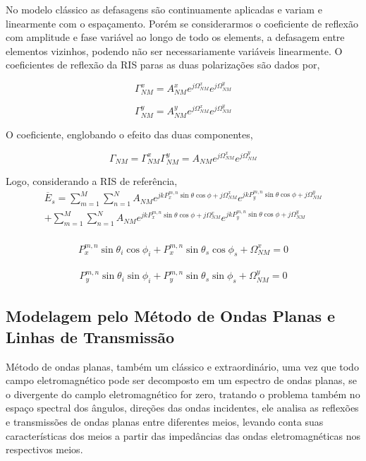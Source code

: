 \documentclass[
	12pt,				%
	openright,			%
	oneside,			%
	a4paper,			%
	english,			%
	brazil				%
	]{abntex2}
\begin{document}
No modelo clássico as defasagens são continuamente aplicadas e variam e linearmente com o espaçamento.
Porém se considerarmos o coeficiente de reflexão com amplitude e fase variável ao longo de todo os elements, a defasagem entre elementos vizinhos, podendo não ser necessariamente variáveis linearmente. O coeficientes de reflexão da RIS paras as duas polarizações são dados por,

\begin{equation}
\Gamma^{x}_{NM}=A^{x}_{NM} e^{j \Omega^x_{NM}}e^{j \Omega^y_{NM}}
\end{equation}

\begin{equation}
\Gamma^{y}_{NM}=A^{y}_{NM} e^{j \Omega^x_{NM}}e^{j \Omega^y_{NM}}
\end{equation}

O coeficiente, englobando o efeito das duas componentes,

\begin{equation}
\Gamma_{NM}=\Gamma^{x}_{NM}\Gamma^{y}_{NM}=A_{NM} e^{j \Omega^x_{NM}}e^{j \Omega^y_{NM}}
\end{equation}

Logo, considerando a RIS de referência, 
\begin{align}
\overline{E}_s=\sum_{m=1}^{M} \sum_{n=1}^{N} A_{NM}e^{jk P_x^{m,n}\sin \theta \cos \phi+j\Omega_{NM}^x}
                                e^{jk P_y^{m,n}\sin \theta \cos \phi+j\Omega_{NM}^y}\\
                                
   +\sum_{m=1}^{M} \sum_{n=1}^{N} A_{NM}e^{jk P_x^{m,n}\sin \theta \cos \phi+j\Omega_{NM}^x}
                                e^{jk P_y^{m,n}\sin \theta \cos \phi+j\Omega_{NM}^y}\\                             
\end{align}


\begin{align}
    P_x^{m,n}\sin{\theta_i} \cos{\phi_i} + 
P_x^{m,n}\sin{\theta_s} \cos{\phi_s} + 
\Omega_{NM}^{x}=0
\end{align}


\begin{align}
P_y^{m,n}\sin{\theta_i} \sin{\phi_i}
+ P_y^{m,n}\sin{\theta_s} \sin{\phi_s}+
\Omega_{NM}^y=0
\end{align}



\subsection{Modelagem pelo Método de Ondas Planas e Linhas de Transmissão}\label{FormulaçãoPWTLBalanis}
Método de ondas planas, também um clássico e extraordinário, uma vez que todo campo eletromagnético pode ser decomposto em um espectro de ondas planas, se o divergente do camplo eletromagnético for zero, tratando o problema também no espaço spectral dos ângulos, direções das ondas incidentes, ele analisa as reflexões e transmissões de ondas planas entre diferentes meios, levando conta suas características dos meios a partir das impedâncias das ondas eletromagnéticas nos respectivos meios. 
\end{document}
